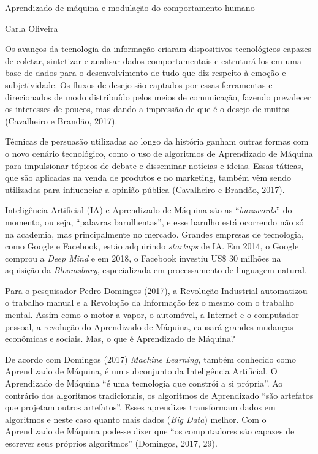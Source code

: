 \protect\hypertarget{__DdeLink__2453_313564555}{}{}Aprendizado de
máquina e modulação do comportamento humano

Carla Oliveira

Os avanços da tecnologia da informação criaram dispositivos tecnológicos
capazes de coletar, sintetizar e analisar dados comportamentais e
estruturá-los em uma base de dados para o desenvolvimento de tudo que
diz respeito à emoção e subjetividade. Os fluxos de desejo são captados
por essas ferramentas e direcionados de modo distribuído pelos meios de
comunicação, fazendo prevalecer os interesses de poucos, mas dando a
impressão de que é o desejo de muitos (Cavalheiro e Brandão, 2017).

Técnicas de persuasão utilizadas ao longo da história ganham outras
formas com o novo cenário tecnológico, como o uso de algoritmos de
Aprendizado de Máquina para impulsionar tópicos de debate e disseminar
notícias e ideias. Essas táticas, que são aplicadas na venda de produtos
e no marketing, também vêm sendo utilizadas para influenciar a opinião
pública (Cavalheiro e Brandão, 2017).

Inteligência Artificial (IA) e Aprendizado de Máquina são as
``\emph{buzzwords}'' do momento, ou seja, ``palavras barulhentas'', e
esse barulho está ocorrendo não só na academia, mas principalmente no
mercado. Grandes empresas de tecnologia, como Google e Facebook, estão
adquirindo \emph{startups} de IA. Em 2014, o Google comprou a \emph{Deep
Mind} e em 2018, o Facebook investiu US\$ 30 milhões na aquisição da
\emph{Bloomsbury}, especializada em processamento de linguagem natural.

Para o pesquisador Pedro Domingos (2017), a Revolução Industrial
automatizou o trabalho manual e a Revolução da Informação fez o mesmo
com o trabalho mental. Assim como o motor a vapor, o automóvel, a
Internet e o computador pessoal, a revolução do Aprendizado de Máquina,
causará grandes mudanças econômicas e sociais. Mas, o que é Aprendizado
de Máquina?

De acordo com Domingos (2017) \emph{Machine Learning,} também conhecido
como Aprendizado de Máquina, é um subconjunto da Inteligência
Artificial. O Aprendizado de Máquina ``é uma tecnologia que constrói a
si própria''. Ao contrário dos algoritmos tradicionais, os algoritmos de
Aprendizado ``são artefatos que projetam outros artefatos''. Esses
aprendizes transformam dados em algoritmos e neste caso quanto mais
dados (\emph{Big Data}) melhor. Com o Aprendizado de Máquina pode-se
dizer que ``os computadores são capazes de escrever seus próprios
algoritmos'' (Domingos, 2017, 29).

